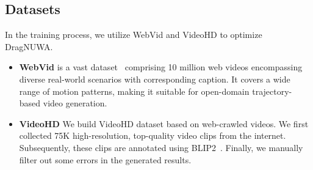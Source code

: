 \documentclass{article} %
\begin{document}
\subsection{Datasets}
In the training process, we utilize WebVid and VideoHD to optimize DragNUWA. 
\begin{itemize}
\item \textbf{WebVid} is a vast dataset~\citet{bainFrozenTimeJoint2021} comprising 10 million web videos encompassing diverse real-world scenarios with corresponding caption. It covers a wide range of motion patterns, making it suitable for open-domain trajectory-based video generation.

\item \textbf{VideoHD} We build VideoHD dataset based on web-crawled videos. We first collected 75K high-resolution, top-quality video clips from the internet. Subsequently, these clips are annotated using BLIP2~\citet{liBLIP2BootstrappingLanguageImage2023}. Finally, we manually filter out some errors in the generated results.

\end{itemize}
\end{document}
